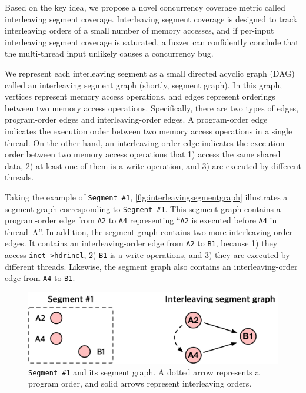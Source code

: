 \newcommand{\mutable}{mutable edge\xspace}
\newcommand{\mutables}{mutable edges\xspace}
\newcommand{\immutable}{immutable edge\xspace}
\newcommand{\immutables}{immutable edges\xspace}

Based on the key idea, we propose a novel concurrency coverage metric
called interleaving segment coverage.
%
Interleaving segment coverage is designed to track interleaving orders
of a small number of memory accesses, and if per-input interleaving
segment coverage is saturated, a fuzzer can confidently conclude that
the multi-thread input unlikely causes a concurrency bug.

%
We represent each interleaving segment as a small directed acyclic
graph (DAG) called an interleaving segment graph (shortly, segment
graph).
%
In this graph, vertices represent memory access operations, and edges
represent orderings between two memory access operations.
%
Specifically, there are two types of edges, program-order edges and
interleaving-order edges.
%
A program-order edge indicates the execution order between two memory
access operations in a single thread.
%
On the other hand, an interleaving-order edge indicates the execution
order between two memory access operations that 1) access the same
shared data, 2) at least one of them is a write operation, and 3) are
executed by different threads.

Taking the example of \texttt{Segment \#1},
\autoref{fig:interleavingsegmentgraph} illustrates a segment graph
corresponding to \texttt{Segment \#1}.
%
This segment graph contains a program-order edge from \texttt{A2} to
\texttt{A4} representing ``\texttt{A2} is executed before \texttt{A4}
in thread~A''.
%
In addition, the segment graph contains two more interleaving-order
edges. It contains an interleaving-order edge from \texttt{A2} to
\texttt{B1}, because 1) they access \texttt{inet->hdrincl}, 2)
\texttt{B1} is a write operations, and 3) they are executed by
different threads. Likewise, the segment graph also contains an
interleaving-order edge from \texttt{A4} to \texttt{B1}.

\begin{figure}[t]
  \centering
  \includegraphics[width=0.9\linewidth]{fig/interleavingsegmentgraph.pdf}
  \caption{\texttt{Segment \#1} and its segment graph. A
    dotted arrow represents a program order, and solid arrows
    represent interleaving orders.}
  \label{fig:interleavingsegmentgraph}
\end{figure}

